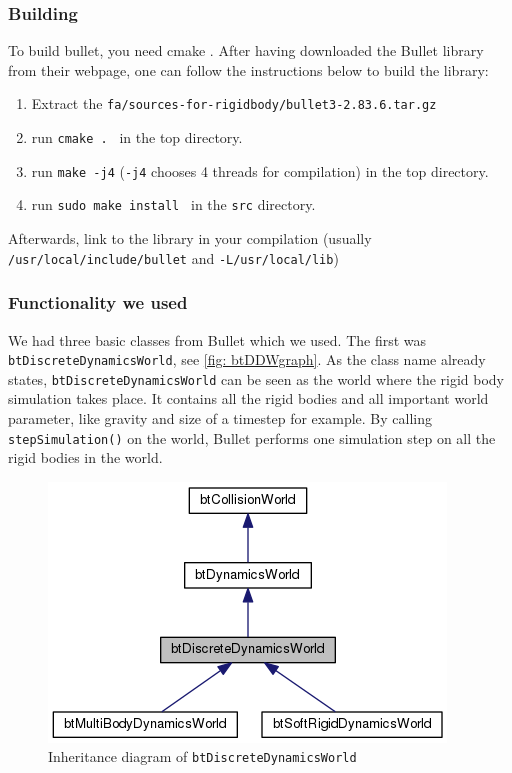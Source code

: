 \subsubsection{Building}
To build bullet, you need cmake \cite{CMake}. After having downloaded the Bullet library from their webpage, one can follow the instructions below to build the library:
\begin{enumerate}
\item Extract the \verb+fa/sources-for-rigidbody/bullet3-2.83.6.tar.gz +
\item run \verb+cmake . + in the top directory.
\item run \verb+make -j4+ (\verb+-j4+ chooses 4 threads for compilation) in the top directory.
\item run \verb+sudo make install + in the \verb+src+ directory.
\end{enumerate}
Afterwards, link to the library in your compilation (usually \verb+/usr/local/include/bullet+ and \verb+-L/usr/local/lib+)
\subsubsection{Functionality we used}
We had three basic classes from Bullet which we used. The first was \verb+btDiscreteDynamicsWorld+, see \autoref{fig: btDDWgraph}. As the class name already states, \verb+btDiscreteDynamicsWorld+ can be seen as the world where the rigid body simulation takes place. It contains all the rigid bodies and all important world parameter, like gravity and size of a timestep for example. By calling \verb+stepSimulation()+ on the world, Bullet performs one simulation step on all the rigid bodies in the world.
\begin{figure}
\centering
\includegraphics[scale=0.5]{img/RigidBodies/btDiscreteDynamicsWorldGraph.png}
\caption{Inheritance diagram of \texttt{btDiscreteDynamicsWorld}}
\label{fig: btDDWgraph}
\end{figure}


